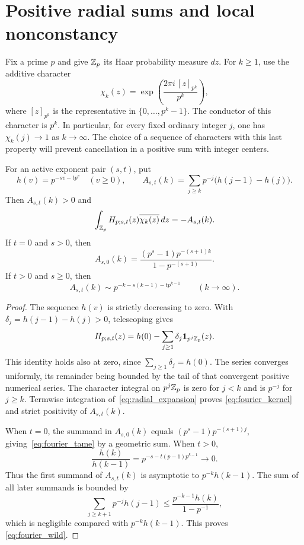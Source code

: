 \section{Positive radial sums and local nonconstancy}\label{sec:fourier}

Fix a prime $p$ and give $\mathbb Z_p$ its Haar probability measure $dz$.
For $k\geq1$, use the additive character
\begin{equation}\label{eq:character}
 \chi_k(z)=\exp\!\left(\frac{2\pi i\,[z]_{p^k}}{p^k}\right),
\end{equation}
where $[z]_{p^k}$ is the representative in $\{0,\ldots,p^k-1\}$.
The conductor of this character is $p^k$. In particular, for every fixed
ordinary integer $j$, one has $\chi_k(j)\longrightarrow1$ as $k\to\infty$.
The choice of a sequence of characters with this last property will
prevent cancellation in a positive sum with integer centers.

\begin{lemma}\label{lem:fourier}
For an active exponent pair $(s,t)$, put
\[
 h(v)=p^{-sv-tp^v}\quad(v\geq0),\qquad
 A_{s,t}(k)=\sum_{j\geq k}p^{-j}\bigl(h(j-1)-h(j)\bigr).
\]
Then $A_{s,t}(k)>0$ and
\begin{equation}\label{eq:fourier_kernel}
 \int_{\mathbb Z_p}H_{p;s,t}(z)\overline{\chi_k(z)}\,dz=-A_{s,t}(k).
\end{equation}
If $t=0$ and $s>0$, then
\begin{equation}\label{eq:fourier_tame}
 A_{s,0}(k)=
 \frac{(p^s-1)p^{-(s+1)k}}{1-p^{-(s+1)}}.
\end{equation}
If $t>0$ and $s\geq0$, then
\begin{equation}\label{eq:fourier_wild}
 A_{s,t}(k)\sim p^{-k-s(k-1)-tp^{k-1}}
 \qquad(k\to\infty).
\end{equation}
\end{lemma}

\begin{proof}
The sequence $h(v)$ is strictly decreasing to zero. With
$\delta_j=h(j-1)-h(j)>0$, telescoping gives
\begin{equation}\label{eq:radial_expansion}
 H_{p;s,t}(z)=h(0)-\sum_{j\geq1}\delta_j\mathbf 1_{p^j\mathbb Z_p}(z).
\end{equation}
This identity holds also at zero, since $\sum_{j\geq1}\delta_j=h(0)$.
The series converges uniformly, its remainder being bounded by the tail
of that convergent positive numerical series. The character integral on
$p^j\mathbb Z_p$ is zero for $j<k$ and is $p^{-j}$ for $j\geq k$.
Termwise integration of~\eqref{eq:radial_expansion} proves
\eqref{eq:fourier_kernel} and strict positivity of $A_{s,t}(k)$.

When $t=0$, the summand in $A_{s,0}(k)$ equals
$(p^s-1)p^{-(s+1)j}$, giving~\eqref{eq:fourier_tame} by a geometric sum.
When $t>0$,
\[
 \frac{h(k)}{h(k-1)}=p^{-s-t(p-1)p^{k-1}}\longrightarrow0.
\]
Thus the first summand of $A_{s,t}(k)$ is asymptotic to
$p^{-k}h(k-1)$. The sum of all later summands is bounded by
\[
 \sum_{j\geq k+1}p^{-j}h(j-1)
 \leq\frac{p^{-k-1}h(k)}{1-p^{-1}},
\]
which is negligible compared with $p^{-k}h(k-1)$. This proves
\eqref{eq:fourier_wild}.
\end{proof}

